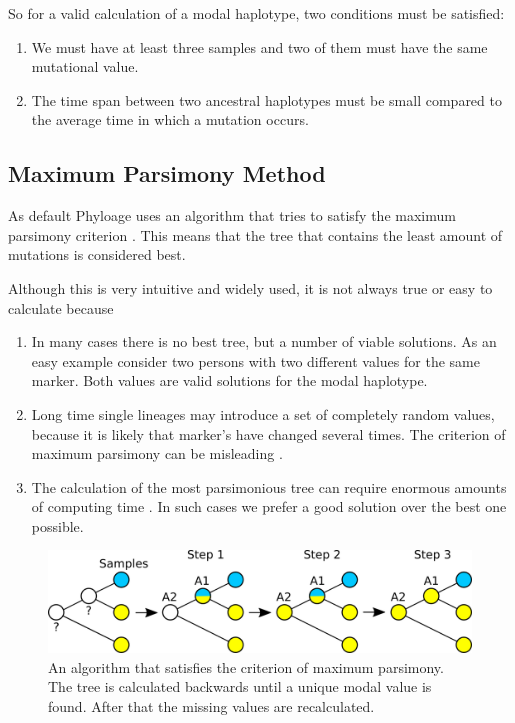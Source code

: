 So for a valid calculation of a modal haplotype, two
conditions must be satisfied:

\begin{enumerate}
\item We must have at least three samples and two of them must
	have the same mutational value.
\item The time span between two ancestral haplotypes must be
	small compared to the average time in which a mutation occurs.
\end{enumerate}


\subsection{Maximum Parsimony Method}

As default Phyloage uses an algorithm that tries to satisfy
the maximum parsimony criterion \cite{Wiki-Maximum_parsimony}.
This means that the tree that contains the least amount of
mutations is considered best.

Although this is very intuitive and widely used, it is not
always true or easy to calculate because

\begin{enumerate}
\item In many cases there is no best tree, but a number of
	viable solutions. As an easy example consider two persons
	with two different values for the same marker. Both values
	are valid solutions for the modal haplotype.
\item Long time single lineages may introduce a set of completely
	random values, because it is likely that marker's have changed
	several times. The criterion of maximum parsimony can be
	misleading \cite{Fels78}.
\item The calculation of the most parsimonious tree can require
	enormous amounts of computing time \cite{Wiki-Maximum_parsimony}.
	In such cases we prefer a good solution over the best one possible.
\end{enumerate}

\begin{figure}[ht]
\centering
\includegraphics[width=13cm]{img/parsimony.png}
\caption{\label{parsimony} An algorithm that satisfies the
criterion of maximum parsimony. The tree is calculated backwards
until a unique modal value is found. After that the missing
values are recalculated.}
\end{figure}

